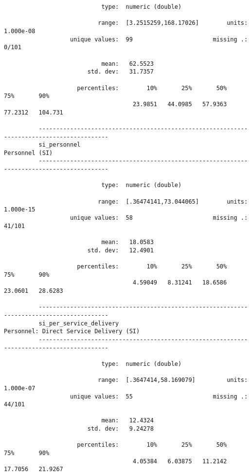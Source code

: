 \documentclass{article}
\begin{document}
\begin{verbatim}
                            type:  numeric (double)
          
                           range:  [3.2515259,168.17026]        units:  1.000e-08
                   unique values:  99                       missing .:  0/101
          
                            mean:   62.5523
                        std. dev:   31.7357
          
                     percentiles:        10%       25%       50%       75%       90%
                                     23.9851   44.0985   57.9363   77.2312   104.731
          
          ------------------------------------------------------------------------------------------
          si_personnel                                                                Personnel (SI)
          ------------------------------------------------------------------------------------------
          
                            type:  numeric (double)
          
                           range:  [.36474141,73.044065]        units:  1.000e-15
                   unique values:  58                       missing .:  41/101
          
                            mean:   18.0583
                        std. dev:   12.4901
          
                     percentiles:        10%       25%       50%       75%       90%
                                     4.59049   8.31241   18.6586   23.0601   28.6283
          
          ------------------------------------------------------------------------------------------
          si_per_service_delivery                            Personnel: Direct Service Delivery (SI)
          ------------------------------------------------------------------------------------------
          
                            type:  numeric (double)
          
                           range:  [.3647414,58.169079]         units:  1.000e-07
                   unique values:  55                       missing .:  44/101
          
                            mean:   12.4324
                        std. dev:   9.24278
          
                     percentiles:        10%       25%       50%       75%       90%
                                     4.05384   6.03875   11.2142   17.7056   21.9267
          

\end{verbatim}
\end{document}
